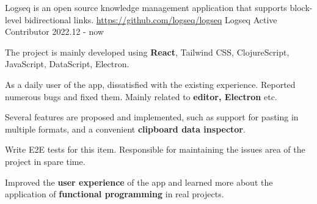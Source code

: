 \begin{cventries}
\cventry
     {Logseq is an open source knowledge management application that supports block-level bidirectional links. \href{https://github.com/logseq/logseq}{https://github.com/logseq/logseq}} %
     {Logseq Active Contributor} %
     {} %
     {2022.12 - now} %
     {
       \begin{cvitems} %
         \item {The project is mainly developed using \textbf{React}, Tailwind CSS, ClojureScript, JavaScript, DataScript, Electron. }
         \item{As a daily user of the app, dissatisfied with the existing experience. Reported numerous bugs and fixed them. Mainly related to \textbf{editor, Electron} etc. }
         \item {Several features are proposed and implemented, such as support for pasting in multiple formats, and a convenient \textbf{clipboard data inspector}. }
         \item{Write E2E tests for this item. Responsible for maintaining the issues area of the project in spare time. }
         \item{Improved the \textbf{user experience} of the app and learned more about the application of \textbf{functional programming} in real projects. }
       \end{cvitems}
     }

\end{cventries}